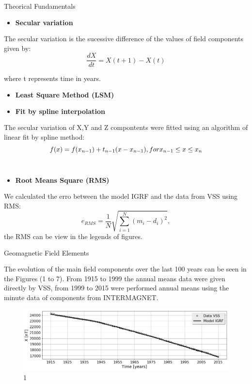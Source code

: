 \documentclass[final,t]{beamer}
\begin{document}
\begin{columns}[t]
\begin{column}{.66\linewidth}
\begin{columns}
\begin{column}{.31\linewidth}
\begin{block}{Theorical Fundamentals}
\begin{itemize}
	
	\item \bf{Secular variation}
\end{itemize}
The secular variation is the sucessive difference of the values of field components given by:
\[\frac{dX}{dt} = X(t+1)-X(t)\]

where t represents time in years.

\begin{itemize}
\justifying
		\item \bf{Least Square Method (LSM)}
\end{itemize}

\begin{itemize}
\justifying
		\item \bf{Fit by spline interpolation}
\end{itemize}
The secular variation of X,Y and Z compontents were fitted using an algorithm  of linear fit by spline method: 
	\[ f(x)= f(x_{n-1})+t_{n-1}(x-x_{n-1}), \\
	for x_{n-1} \le x \le x_{n} \]\\

\begin{itemize}
\justifying
		\item \bf{Root Means Square (RMS)}
\end{itemize}
We calculated the erro between the model IGRF and the data from VSS using RMS:
\[e_{RMS}=\frac{1}{N} \sqrt{\sum\limits_{i=1}^{N}(m_{i}-d_{i})^{2}}, 
\]
the RMS can be view in the legends of figures.
 
	
\end{block}	

\begin{block}{Geomagnetic Field Elements}

The evolution of the main field components over the last 100 years can be seen in the Figures (1 to 7). From 1915 to 1999 the  annual means data  were given directly by VSS, from 1999 to 2015 were performed annual means using the minute data of components from INTERMAGNET.

\begin{figure}
\centering
\includegraphics[scale=0.5]{"figs_ed/X mean all_V3"}
\caption[1]{1}
\label{fig:Xmeanall_V2}
\end{figure}
   

\end{block}
\end{column}
\end{columns}
\end{column}
\end{columns}
\end{document}
